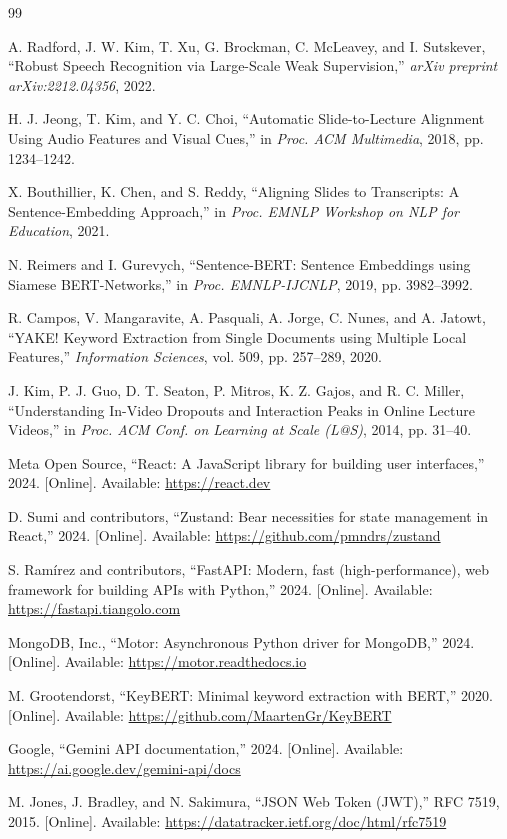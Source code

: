 \documentclass[conference]{IEEEtran}
\begin{document}
\begin{thebibliography}{99}

A. Radford, J. W. Kim, T. Xu, G. Brockman, C. McLeavey, and I. Sutskever, ``Robust Speech Recognition via Large-Scale Weak Supervision,'' \textit{arXiv preprint arXiv:2212.04356}, 2022.

H. J. Jeong, T. Kim, and Y. C. Choi, ``Automatic Slide-to-Lecture Alignment Using Audio Features and Visual Cues,'' in \textit{Proc. ACM Multimedia}, 2018, pp. 1234--1242.

X. Bouthillier, K. Chen, and S. Reddy, ``Aligning Slides to Transcripts: A Sentence-Embedding Approach,'' in \textit{Proc. EMNLP Workshop on NLP for Education}, 2021.

N. Reimers and I. Gurevych, ``Sentence-BERT: Sentence Embeddings using Siamese BERT-Networks,'' in \textit{Proc. EMNLP-IJCNLP}, 2019, pp. 3982--3992.

R. Campos, V. Mangaravite, A. Pasquali, A. Jorge, C. Nunes, and A. Jatowt, ``YAKE! Keyword Extraction from Single Documents using Multiple Local Features,'' \textit{Information Sciences}, vol. 509, pp. 257--289, 2020.

J. Kim, P. J. Guo, D. T. Seaton, P. Mitros, K. Z. Gajos, and R. C. Miller, ``Understanding In-Video Dropouts and Interaction Peaks in Online Lecture Videos,'' in \textit{Proc. ACM Conf. on Learning at Scale (L@S)}, 2014, pp. 31--40.

Meta Open Source, ``React: A JavaScript library for building user interfaces,'' 2024. [Online]. Available: \url{https://react.dev}

D. Sumi and contributors, ``Zustand: Bear necessities for state management in React,'' 2024. [Online]. Available: \url{https://github.com/pmndrs/zustand}

S. Ram\'{i}rez and contributors, ``FastAPI: Modern, fast (high-performance), web framework for building APIs with Python,'' 2024. [Online]. Available: \url{https://fastapi.tiangolo.com}

MongoDB, Inc., ``Motor: Asynchronous Python driver for MongoDB,'' 2024. [Online]. Available: \url{https://motor.readthedocs.io}

M. Grootendorst, ``KeyBERT: Minimal keyword extraction with BERT,'' 2020. [Online]. Available: \url{https://github.com/MaartenGr/KeyBERT}

Google, ``Gemini API documentation,'' 2024. [Online]. Available: \url{https://ai.google.dev/gemini-api/docs}

M. Jones, J. Bradley, and N. Sakimura, ``JSON Web Token (JWT),'' RFC 7519, 2015. [Online]. Available: \url{https://datatracker.ietf.org/doc/html/rfc7519}

\end{thebibliography}
\end{document}
